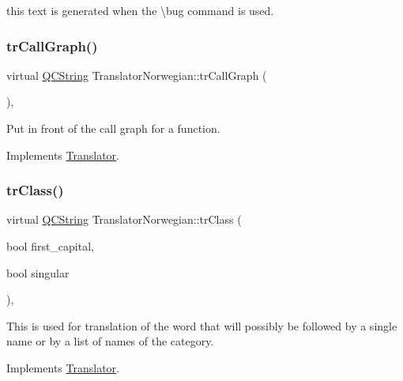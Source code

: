 this text is generated when the \textbackslash{}bug command is used. \mbox{\label{class_translator_norwegian_a6bd49fa53e6372680815c3b39b425f1c}} 
\subsubsection{\texorpdfstring{trCallGraph()}{trCallGraph()}}
{\footnotesize\ttfamily virtual \mbox{\hyperlink{class_q_c_string}{Q\+C\+String}} Translator\+Norwegian\+::tr\+Call\+Graph (\begin{DoxyParamCaption}{ }\end{DoxyParamCaption})\hspace{0.3cm}{\ttfamily [inline]}, {\ttfamily [virtual]}}

Put in front of the call graph for a function. 

Implements \mbox{\hyperlink{class_translator}{Translator}}.

\mbox{\label{class_translator_norwegian_ab275874b6bcba054f4ec80882fc5702a}} 
\subsubsection{\texorpdfstring{trClass()}{trClass()}}
{\footnotesize\ttfamily virtual \mbox{\hyperlink{class_q_c_string}{Q\+C\+String}} Translator\+Norwegian\+::tr\+Class (\begin{DoxyParamCaption}\item[{bool}]{first\+\_\+capital,  }\item[{bool}]{singular }\end{DoxyParamCaption})\hspace{0.3cm}{\ttfamily [inline]}, {\ttfamily [virtual]}}

This is used for translation of the word that will possibly be followed by a single name or by a list of names of the category. 

Implements \mbox{\hyperlink{class_translator}{Translator}}.

\mbox{\label{class_translator_norwegian_ac3fdd9c68f86820273ed846947b36a32}} 
